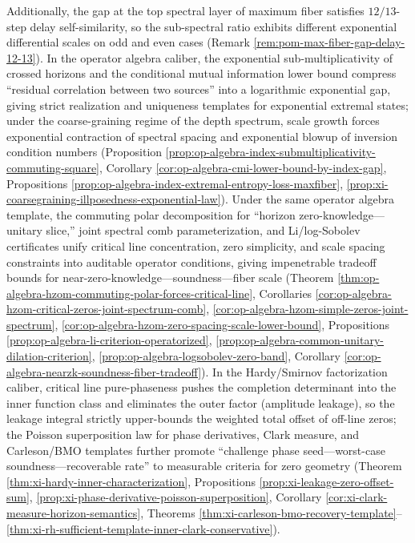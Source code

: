 Additionally, the gap at the top spectral layer of maximum fiber satisfies \(12/13\)-step delay self-similarity, so the sub-spectral ratio exhibits different exponential differential scales on odd and even cases (Remark \ref{rem:pom-max-fiber-gap-delay-12-13}).
In the operator algebra caliber, the exponential sub-multiplicativity of crossed horizons and the conditional mutual information lower bound compress ``residual correlation between two sources'' into a logarithmic exponential gap, giving strict realization and uniqueness templates for exponential extremal states; under the coarse-graining regime of the depth spectrum, scale growth forces exponential contraction of spectral spacing and exponential blowup of inversion condition numbers (Proposition \ref{prop:op-algebra-index-submultiplicativity-commuting-square}, Corollary \ref{cor:op-algebra-cmi-lower-bound-by-index-gap}, Propositions \ref{prop:op-algebra-index-extremal-entropy-loss-maxfiber}, \ref{prop:xi-coarsegraining-illposedness-exponential-law}).
Under the same operator algebra template, the commuting polar decomposition for ``horizon zero-knowledge---unitary slice,'' joint spectral comb parameterization, and Li/log-Sobolev certificates unify critical line concentration, zero simplicity, and scale spacing constraints into auditable operator conditions, giving impenetrable tradeoff bounds for near-zero-knowledge---soundness---fiber scale (Theorem \ref{thm:op-algebra-hzom-commuting-polar-forces-critical-line}, Corollaries \ref{cor:op-algebra-hzom-critical-zeros-joint-spectrum-comb}, \ref{cor:op-algebra-hzom-simple-zeros-joint-spectrum}, \ref{cor:op-algebra-hzom-zero-spacing-scale-lower-bound}, Propositions \ref{prop:op-algebra-li-criterion-operatorized}, \ref{prop:op-algebra-common-unitary-dilation-criterion}, \ref{prop:op-algebra-logsobolev-zero-band}, Corollary \ref{cor:op-algebra-nearzk-soundness-fiber-tradeoff}).
In the Hardy/Smirnov factorization caliber, critical line pure-phaseness pushes the completion determinant into the inner function class and eliminates the outer factor (amplitude leakage), so the leakage integral strictly upper-bounds the weighted total offset of off-line zeros; the Poisson superposition law for phase derivatives, Clark measure, and Carleson/BMO templates further promote ``challenge phase seed---worst-case soundness---recoverable rate'' to measurable criteria for zero geometry (Theorem \ref{thm:xi-hardy-inner-characterization}, Propositions \ref{prop:xi-leakage-zero-offset-sum}, \ref{prop:xi-phase-derivative-poisson-superposition}, Corollary \ref{cor:xi-clark-measure-horizon-semantics}, Theorems \ref{thm:xi-carleson-bmo-recovery-template}--\ref{thm:xi-rh-sufficient-template-inner-clark-conservative}).
